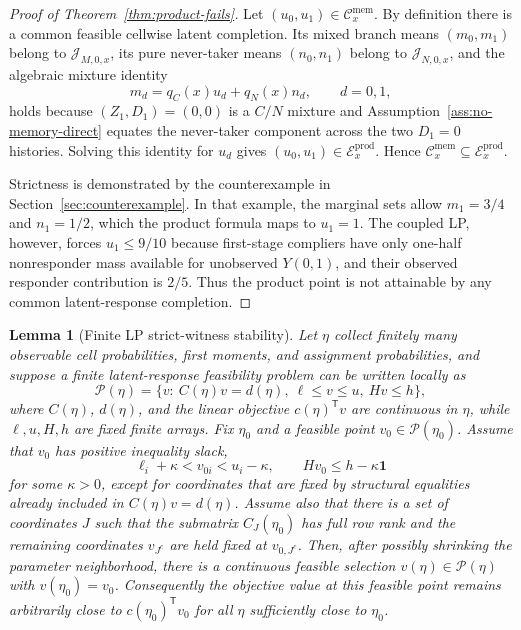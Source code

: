 \documentclass[11pt]{article}
\newcommand{\transpose}{\mathsf{T}}
\theoremstyle{definition}
\theoremstyle{plain}
\newtheorem{lemma}{Lemma}
\theoremstyle{remark}
\begin{document}
\begin{proof}[Proof of Theorem~\ref{thm:product-fails}]
Let \((u_0,u_1)\in\mathcal C_x^{\mathrm{mem}}\).  By definition there is a common feasible cellwise latent completion.  Its mixed branch means \((m_0,m_1)\) belong to \(\mathcal J_{M,0,x}\), its pure never-taker means \((n_0,n_1)\) belong to \(\mathcal J_{N,0,x}\), and the algebraic mixture identity
\[
m_d=q_C(x)u_d+q_N(x)n_d,\qquad d=0,1,
\]
holds because \((Z_1,D_1)=(0,0)\) is a \(C/N\) mixture and Assumption~\ref{ass:no-memory-direct} equates the never-taker component across the two \(D_1=0\) histories.  Solving this identity for \(u_d\) gives \((u_0,u_1)\in\mathcal E_x^{\mathrm{prod}}\).  Hence \(\mathcal C_x^{\mathrm{mem}}\subseteq\mathcal E_x^{\mathrm{prod}}\).

Strictness is demonstrated by the counterexample in Section~\ref{sec:counterexample}.  In that example, the marginal sets allow \(m_1=3/4\) and \(n_1=1/2\), which the product formula maps to \(u_1=1\).  The coupled LP, however, forces \(u_1\le9/10\) because first-stage compliers have only one-half nonresponder mass available for unobserved \(Y(0,1)\), and their observed responder contribution is \(2/5\).  Thus the product point is not attainable by any common latent-response completion.
\end{proof}

\begin{lemma}[Finite LP strict-witness stability]\label{lem:lp-stability}
Let \(\eta\) collect finitely many observable cell probabilities, first moments, and assignment probabilities, and suppose a finite latent-response feasibility problem can be written locally as
\[
\mathcal P(\eta)=
\{v:\ C(\eta)v=d(\eta),\ \ell\le v\le u,\ Hv\le h\},
\]
where \(C(\eta)\), \(d(\eta)\), and the linear objective \(c(\eta)^\transpose v\) are continuous in \(\eta\), while \(\ell,u,H,h\) are fixed finite arrays.  Fix \(\eta_0\) and a feasible point \(v_0\in\mathcal P(\eta_0)\).  Assume that \(v_0\) has positive inequality slack,
\[
\ell_i+\kappa<v_{0i}<u_i-\kappa,\qquad
Hv_0\le h-\kappa\mathbf 1
\]
for some \(\kappa>0\), except for coordinates that are fixed by structural equalities already included in \(C(\eta)v=d(\eta)\).  Assume also that there is a set of coordinates \(J\) such that the submatrix \(C_J(\eta_0)\) has full row rank and the remaining coordinates \(v_{J^c}\) are held fixed at \(v_{0,J^c}\).  Then, after possibly shrinking the parameter neighborhood, there is a continuous feasible selection \(v(\eta)\in\mathcal P(\eta)\) with \(v(\eta_0)=v_0\).  Consequently the objective value at this feasible point remains arbitrarily close to \(c(\eta_0)^\transpose v_0\) for all \(\eta\) sufficiently close to \(\eta_0\).
\end{lemma}
\end{document}
